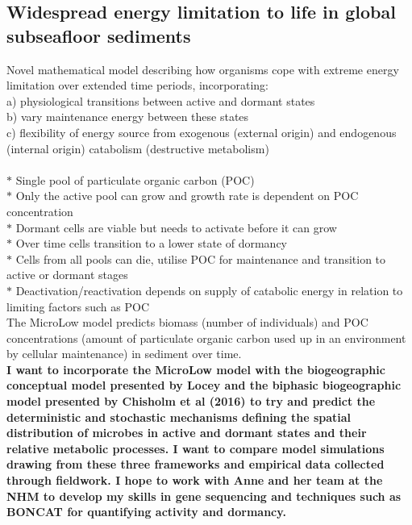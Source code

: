 \subsection{Widespread energy limitation to life in global subseafloor sediments \cite{bradley2020widespread}}

\noindent Novel mathematical model describing how organisms cope with extreme energy limitation over extended time periods, incorporating:\\
a) physiological transitions between active and dormant states\\
b) vary maintenance energy between these states\\
c) flexibility of energy source from exogenous (external origin) and endogenous (internal origin) catabolism (destructive metabolism)\\

\\
{$\ast$ Single pool of particulate organic carbon (POC) }\\
{$\ast$ Only the active pool can grow and growth rate is dependent on POC concentration  }\\
{$\ast$ Dormant cells are viable but needs to activate before it can grow}\\
{$\ast$ Over time cells transition to a lower state of dormancy }\\
{$\ast$ Cells from all pools can die, utilise POC for maintenance and transition to active or dormant stages}\\
{$\ast$ Deactivation/reactivation depends on supply of catabolic energy in relation to limiting factors such as POC}\\

\noindent The MicroLow model predicts biomass (number of individuals) and POC concentrations (amount of particulate organic carbon used up in an environment by cellular maintenance) in sediment over time. \\

\noindent \textbf{I want to incorporate the MicroLow model with the biogeographic conceptual model presented by Locey and the biphasic biogeographic model presented by Chisholm et al (2016) to try and predict the deterministic and stochastic mechanisms defining the spatial distribution of microbes in active and dormant states and their relative metabolic processes. I want to compare model simulations drawing from these three frameworks and empirical data collected through fieldwork. I hope to work with Anne and her team at the NHM to develop my skills in gene sequencing and techniques such as BONCAT for quantifying activity and dormancy.}

